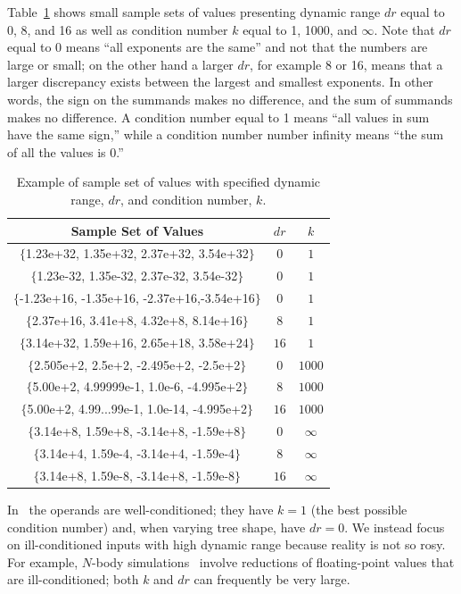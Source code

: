 Table~\ref{tab:parameters} shows small sample sets of values
presenting dynamic range $dr$ equal to 0, 8, and 16 as well as
condition number $k$ equal to 1, 1000, and $\infty$.  Note that $dr$
equal to $0$ means ``all exponents are the same'' and not that the
numbers are large or small; on the other hand a larger $dr$, for
example 8 or 16, means that a larger discrepancy exists between the
largest and smallest exponents. In other words, the sign on the
summands makes no difference, and the sum of summands makes no
difference. A condition number equal to 1 means ``all values in sum
have the same sign,'' while a condition number number infinity means
``the sum of all the values is 0.''
\begin{table}[!ht]
\caption{Example of sample set of values with specified dynamic range,
  $dr$, and condition number, $k$.}
\label{tab:parameters}
\center
\small
\begin{tabular}{|c|c|c|}
  \hline
  Sample Set of Values & $dr$ & $k$ \\
  \hline
  $\{$1.23e+32, 1.35e+32, 2.37e+32, 3.54e+32$\}$ & $0$ & $1$ \\
  $\{$1.23e-32, 1.35e-32, 2.37e-32, 3.54e-32$\}$ & $0$ & $1$ \\
  $\{$-1.23e+16, -1.35e+16, -2.37e+16,-3.54e+16$\}$ & $0$ & $1$ \\
  $\{$2.37e+16, 3.41e+8, 4.32e+8, 8.14e+16$\}$ & $8$ & $1$ \\
  $\{$3.14e+32, 1.59e+16, 2.65e+18, 3.58e+24$\}$ & $16$ & $1$ \\
  \hline
  $\{$2.505e+2, 2.5e+2, -2.495e+2, -2.5e+2$\}$ & $0$ & $1000$ \\
  $\{$5.00e+2, 4.99999e-1, 1.0e-6, -4.995e+2$\}$ & $8$ & $1000$ \\
  $\{$5.00e+2, 4.99...99e-1, 1.0e-14, -4.995e+2$\}$ & $16$ & $1000$ \\
  \hline
  $\{$3.14e+8, 1.59e+8, -3.14e+8, -1.59e+8$\}$ & $0$ & $\infty$ \\
  $\{$3.14e+4, 1.59e-4, -3.14e+4, -1.59e-4$\}$ & $8$ & $\infty$ \\
  $\{$3.14e+8, 1.59e-8, -3.14e+8, -1.59e-8$\}$ & $16$ & $\infty$ \\
  \hline
\end{tabular}
\end{table}
\normalsize In~\cite{chiang13} the operands are well-conditioned; they
have $k=1$ (the best possible condition number) and, when varying tree
shape, have $dr=0$. We instead focus on ill-conditioned inputs with
high dynamic range because reality is not so rosy. For example,
$N$-body simulations~\cite{bailey} involve reductions of
floating-point values that are ill-conditioned; both $k$ and $dr$ can
frequently be very large.

